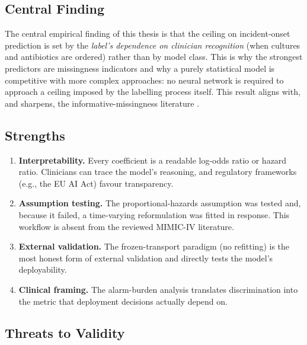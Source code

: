 \subsection{Central Finding}

The central empirical finding of this thesis is that the ceiling on
incident-onset prediction is set by the \emph{label's dependence on clinician
recognition} (when cultures and antibiotics are ordered) rather than by model
class. This is why the strongest predictors are missingness indicators and why
a purely statistical model is competitive with more complex approaches: no
neural network is required to approach a ceiling imposed by the labelling
process itself. This result aligns with, and sharpens, the
informative-missingness literature
\cite{groenwold2020missingness,singh2021missingness}.

\subsection{Strengths}

\begin{enumerate}
  \item \textbf{Interpretability.} Every coefficient is a readable log-odds
  ratio or hazard ratio. Clinicians can trace the model's reasoning, and
  regulatory frameworks (e.g., the EU AI Act) favour transparency.
  \item \textbf{Assumption testing.} The proportional-hazards assumption was
  tested and, because it failed, a time-varying reformulation was fitted in
  response. This workflow is absent from the reviewed MIMIC-IV literature.
  \item \textbf{External validation.} The frozen-transport paradigm (no
  refitting) is the most honest form of external validation and directly
  tests the model's deployability.
  \item \textbf{Clinical framing.} The alarm-burden analysis translates
  discrimination into the metric that deployment decisions actually depend
  on.
\end{enumerate}

\subsection{Threats to Validity}

